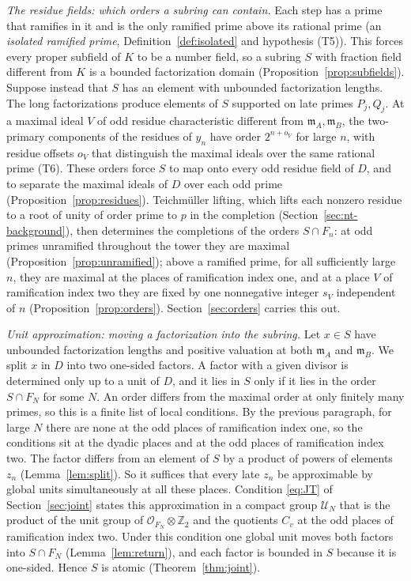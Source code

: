 \documentclass[11pt]{article}
\theoremstyle{plain}
\theoremstyle{definition}
\theoremstyle{remark}
\newcommand{\Z}{\mathbb Z}
\newcommand{\OO}{\mathcal O}
\newcommand{\EA}{\mathfrak m_A}
\newcommand{\EB}{\mathfrak m_B}
\begin{document}
\emph{The residue fields: which orders a subring can contain.}  Each step
has a prime that ramifies in it and is the only ramified prime above its
rational prime (an \emph{isolated ramified prime},
Definition~\ref{def:isolated} and hypothesis (T5)).  This forces every proper subfield of $K$ to be a
number field, so a subring $S$ with fraction field different from $K$ is a
bounded factorization domain (Proposition~\ref{prop:subfields}).  Suppose
instead that $S$ has an element with unbounded factorization lengths.  The
long factorizations produce elements of $S$ supported on late primes
$P_j,Q_j$.  At a maximal ideal $V$ of odd residue characteristic different
from $\EA,\EB$, the two-primary components of the residues of $y_n$ have
order $2^{n+o_V}$ for large $n$, with residue offsets $o_V$ that distinguish the maximal ideals
over the same rational prime (T6).  These orders force $S$ to map onto
every odd residue field of $D$, and to separate the maximal ideals of $D$
over each odd prime (Proposition~\ref{prop:residues}).  Teichm\"uller
lifting, which lifts each nonzero residue to a root of unity of order
prime to $p$ in the completion (Section~\ref{sec:nt-background}), then determines the
completions of the orders $S\cap F_n$: at odd primes unramified throughout
the tower they are maximal (Proposition~\ref{prop:unramified}); above a
ramified prime, for all sufficiently large $n$, they are maximal at the
places of ramification index one, and at a place $V$ of ramification index
two they are fixed by one nonnegative integer $s_V$ independent of $n$
(Proposition~\ref{prop:orders}).  Section~\ref{sec:orders} carries this out.

\emph{Unit approximation: moving a factorization into the subring.}  Let
$x\in S$ have unbounded factorization lengths and positive valuation at
both $\EA$ and $\EB$.  We split $x$ in $D$ into two one-sided factors.  A
factor with a given divisor is determined only up to a unit of $D$, and it
lies in $S$ only if it lies in the order $S\cap F_N$ for some $N$.  An order
differs from the maximal order at only finitely many primes, so this is a
finite list of local conditions.  By the previous paragraph, for large $N$ there are none at the odd
places of ramification index one, so the conditions sit at the dyadic places and at the
odd places of ramification index two.  The factor differs from an element of
$S$ by a product of powers of elements $z_n$ (Lemma~\ref{lem:split}).
So it suffices that every late $z_n$ be approximable by global units
simultaneously at all these places.  Condition \eqref{eq:JT} of
Section~\ref{sec:joint} states this approximation in a compact group
$\mathcal U_N$ that is the product of the unit group of
$\OO_{F_N}\otimes\Z_2$ and the quotients $C_v$ at the odd places of
ramification index two.  Under this condition one global unit moves both
factors into $S\cap F_N$ (Lemma~\ref{lem:return}), and each factor is
bounded in $S$ because it is one-sided.  Hence $S$ is atomic
(Theorem~\ref{thm:joint}).
\end{document}
